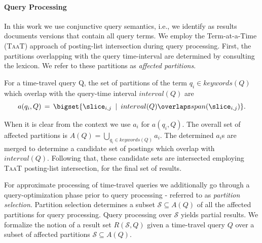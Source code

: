 





\paragraph{Query Processing}
In this work we use conjunctive query semantics, i.e., we identify as results documents versions that contain all query terms. We employ the Term-at-a-Time (\textsc{TaaT}) approach of posting-list intersection during query processing. First, the partitions overlapping with the query time-interval are determined by consulting the lexicon. We refer to these partitions as \emph{affected partitions}. 

\begin{definition}
For a time-travel query Q, the set of partitions of the term $q_i \in keywords(Q)$ which overlap with the query-time interval $interval(Q)$ are 
$$ a(q_i, Q) \,= \, \bigset{  \slice_{i,j} \,\,\, | \,\,\, interval(Q) \overlaps span(\slice_{i,j})}. 
$$
\end{definition}
When it is clear from the context we use $a_i$ for $a(q_i, Q)$. The overall set of affected partitions is $A(Q) = \bigcup_{q_i \in keywords(Q)} a_i$. The determined $a_i$s are merged to determine a candidate set of postings which overlap with $interval(Q)$. Following that, these candidate sets are intersected employing \textsc{TaaT} posting-list intersection, for the final set of results.

For approximate processing of time-travel queries we additionally go through a query-optimization phase prior to query processing -  referred to as \emph{partition selection}. Partition selection determines a subset $\mathcal{S} \subseteq A(Q)$ of all the affected partitions for query processing. Query processing over $\mathcal{S}$ yields partial results. We formalize the notion of a result set $R(\mathcal{S},Q)$ given a time-travel query $Q$ over a subset of affected partitions $\mathcal{S} \subseteq A(Q)$.

